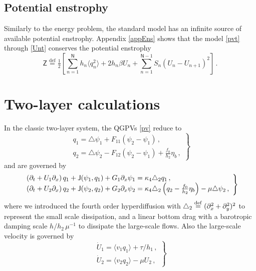 \documentclass{jfm}
\newcommand{\defn}{\ensuremath{\stackrel{\mathrm{def}}{=}}}
\def\beq{\begin{equation}}
\def\eeq{\end{equation}}
\newcommand{\com}{\, ,}
\newcommand{\per}{\, .}
\newcommand{\lap}{\triangle}
\newcommand{\ssd}{\kappa_4 \triangle_2}
\newcommand{\avxy}[1]{\langle{#1}\rangle}
\newcommand{\nmax}{\mathsf{N}}
\newcommand{\jacob}[2]{\mathsf{J}(#1,#2)}
\newcommand{\la}{\langle}
\newcommand{\ra}{\rangle}
\newcommand{\half}{\tfrac{1}{2}}
\newcommand{\sZ}{\mathsf{Z}}
\begin{document}
\subsection{Potential enstrophy}
Similarly to the energy problem, the standard model has an infinite source of
available potential enstrophy. Appendix \ref{appEns} shows that the model \eqref{pvt} through
\eqref{Unt} conserves the potential enstrophy
\beq \label{pens}
\sZ \defn \half \left[\sum_{n=1}^{\nmax} h_n \avxy{q_n^2} + 2 h_n \beta U_n
+ \sum_{n=1}^{\nmax-1} S_n (U_n - U_{n+1})^2\right]\per
\eeq

\section{Two-layer calculations}\label{sec:two_layer}

In the classic two-layer system, the QGPVs \eqref{pv} reduce to
\begin{equation}
\left. \begin{array}{l}
\displaystyle
   \label{pv2}
   {q_1} = \lap\psi_1 + F_{11} \left(\psi_{2}-\psi_1\right)\com \\
   {q_2} = \lap\psi_2 - F_{12}\left(\psi_{2}-\psi_1\right) +
   \frac{f_0}{h_2}\eta_b \com
\end{array} \right\}
\end{equation}
and are governed by
\begin{equation}\label{pv_evolution2}
\left. \begin{array}{l}
\displaystyle
\left(\p_t + U_1 \p_x\right) q_1  + \jacob{\psi_1}{q_1} + G_1 \p_x \psi_1
= \ssd q_1 \com\\
\left(\p_t + U_2 \p_x\right) q_2  + \jacob{\psi_2}{q_2}+ G_2 \p_x \psi_2
= \ssd \left(q_2-\frac{f_0}{h_2}\eta_b\right) - \mu \lap \psi_2 \com
\end{array} \right\}
\end{equation}
where we introduced the fourth order hyperdiffusion with $\triangle_2 \defn
(\p_x^2+\p_y^2)^2$ to represent the small scale dissipation, and a linear
bottom drag with a barotropic damping scale $h/h_2 \, \mu^{-1}$ to
dissipate the large-scale flows. Also the large-scale velocity is governed by
\begin{equation}\label{slowUevolution2}
\left. \begin{array}{l}
\displaystyle
    \dot U_1  = \la v_1 q_1 \ra + \tau/h_1 \com \\
    \dot U_2  = \la v_2 q_2 \ra - \mu U_2  \com
  \end{array} \right\}
\end{equation}
\end{document}
